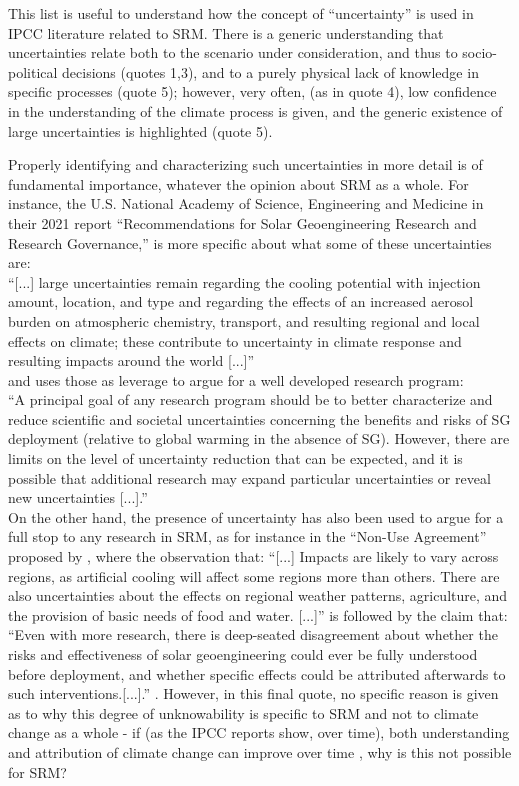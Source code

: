 \documentclass[acp, manuscript]{copernicus}
\begin{document}
This list is useful to understand how the concept of ``uncertainty'' is used in IPCC literature related to SRM. There is a generic understanding that uncertainties relate both to the scenario under consideration, and thus to socio-political decisions (quotes 1,3), and to a purely physical lack of knowledge in specific processes (quote 5); however, very often, (as in quote 4), low confidence in the understanding of the climate process is given, and the generic existence of large uncertainties is highlighted (quote 5). 

Properly identifying and characterizing such uncertainties in more detail is of fundamental importance, whatever the opinion about SRM as a whole. For instance, the U.S. National Academy of Science, Engineering and Medicine in their 2021 report ``Recommendations for Solar Geoengineering Research and Research Governance,'' \citep{NASEM2021} is more specific about what some of these uncertainties are: \\

 ``[...] large uncertainties remain regarding the cooling potential with injection amount, location, and type and regarding the effects of an increased aerosol burden on atmospheric chemistry, transport, and resulting regional and local effects on climate; these contribute to uncertainty in climate response and resulting impacts around the world [...]'' \\
 
 and uses those as leverage to argue for a well developed research program: \\
 
 ``A principal goal of any research program should be to better characterize and reduce scientific and societal uncertainties concerning the benefits and risks of SG deployment (relative to global warming in the absence of SG). However, there are limits on the level of uncertainty reduction that can be expected, and it is possible that additional research may expand particular uncertainties or reveal new uncertainties [...].'' \\

On the other hand, the presence of uncertainty has also been used to argue for a full stop to any research in SRM, as for instance in the ``Non-Use Agreement'' proposed by \cite{Biermann2022}, where the observation that: “[...] Impacts are likely to vary across regions, as artificial cooling will affect some regions more than others. There are also uncertainties about the effects on regional weather patterns, agriculture, and the provision of basic needs of food and water. [...]” is followed by the claim that: “Even with more research, there is deep-seated disagreement about whether the risks and effectiveness of solar geoengineering could ever be fully understood before deployment, and whether specific effects could be attributed afterwards to such interventions.[...].'' . However, in this final quote, no specific reason is given as to why this degree of unknowability is specific to SRM and not to climate change as a whole - if (as the IPCC reports show, over time), both understanding and attribution of climate change can improve over time \citep{IPCC_2021_WGI}, why is this not possible for SRM?\\
\end{document}
